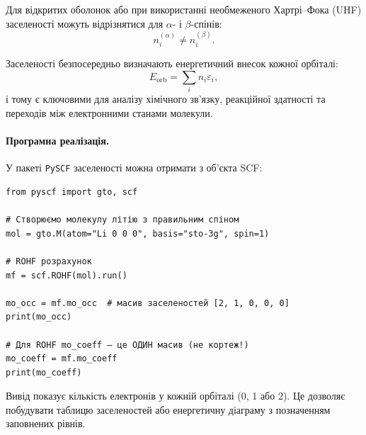 Для відкритих оболонок або при використанні необмеженого Хартрі–Фока (UHF)
заселеності можуть відрізнятися для $\alpha$- і $\beta$-спінів:
\[
n_i^{(\alpha)} \neq n_i^{(\beta)}.
\]


Заселеності безпосередньо визначають енергетичний внесок кожної орбіталі:
\[
E_\mathrm{orb} = \sum_i n_i \varepsilon_i,
\]
і тому є ключовими для аналізу хімічного зв’язку, реакційної здатності
та переходів між електронними станами молекули.

\paragraph{Програмна реалізація.}
У пакеті \texttt{PySCF} заселеності можна отримати з об’єкта SCF:
\begin{verbatim}
from pyscf import gto, scf

# Створюємо молекулу літію з правильним спіном
mol = gto.M(atom="Li 0 0 0", basis="sto-3g", spin=1)

# ROHF розрахунок
mf = scf.ROHF(mol).run()

mo_occ = mf.mo_occ  # масив заселеностей [2, 1, 0, 0, 0]
print(mo_occ)

# Для ROHF mo_coeff — це ОДИН масив (не кортеж!)
mo_coeff = mf.mo_coeff
print(mo_coeff)
\end{verbatim}

Вивід  показує кількість електронів у кожній орбіталі
(0, 1 або 2). Це дозволяє побудувати таблицю заселеностей
або енергетичну діаграму з позначенням заповнених рівнів.

